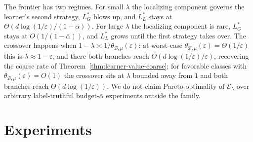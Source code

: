 \documentclass[runningheads,envcountsame]{llncs}
\newcommand{\cB}{\mathcal{B}}
\newcommand{\cE}{\mathcal{E}}
\newcommand{\eps}{\varepsilon}
\newcommand{\dis}{\theta}
\begin{document}
The frontier has two regimes. For small $\lambda$ the localizing component governs the learner's second strategy, $L^*_G$ blows up, and $L^*_L$ stays at $\Theta(d \log(1/\eps)/(1-\bar\alpha))$. For large $\lambda$ the localizing component is rare, $L^*_G$ stays at $O(1/(1-\bar\alpha))$, and $L^*_L$ grows until the first strategy takes over. The crossover happens when $1 - \lambda \asymp 1/\dis_{\cB,\mu}(\eps)$: at worst-case $\dis_{\cB,\mu}(\eps) = \Theta(1/\eps)$ this is $\lambda \approx 1 - \eps$, and there both branches reach $\tilde\Theta(d \log(1/\eps)/\eps)$, recovering the coarse rate of Theorem~\ref{thm:learner-value-coarse}; for favorable classes with $\dis_{\cB,\mu}(\eps) = O(1)$ the crossover sits at $\lambda$ bounded away from $1$ and both branches reach $\Theta(d \log(1/\eps))$. We do not claim Pareto-optimality of $\cE_\lambda$ over arbitrary label-truthful budget-$\bar\alpha$ experiments outside the family.

\section{Experiments}
\label{sec:experiments}
\end{document}
